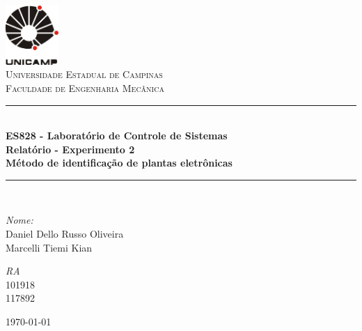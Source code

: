 
\begin{titlepage}
\begin{center}

\newcommand{\HRule}{\rule{\linewidth}{0.5mm}}
\includegraphics[width=0.15\textwidth]{logounicamp.pdf}~\\[1cm]

\textsc{\LARGE Universidade Estadual de Campinas}\\[1.5cm]

\textsc{\Large Faculdade de Engenharia Mecânica}\\[0.5cm]

\HRule \\[0.4cm]
{ \huge \bfseries ES828 - Laboratório de Controle de Sistemas\\ \vspace{1cm} Relatório - Experimento 2 \\
\Large{Método de identificação de plantas eletrônicas} \\[0.4cm] }

\HRule \\[1.5cm]

\begin{minipage}{0.6\textwidth}
\begin{flushleft} \large
\emph{Nome:}\\
Daniel Dello Russo Oliveira\\ Marcelli Tiemi Kian
\end{flushleft}
\end{minipage}
\begin{minipage}{0.2\textwidth}
\begin{flushright} \large
\emph{RA}\\ 101918\\
117892
\end{flushright}
\end{minipage}

\vfill

{\large \today}

\end{center}
\end{titlepage}
